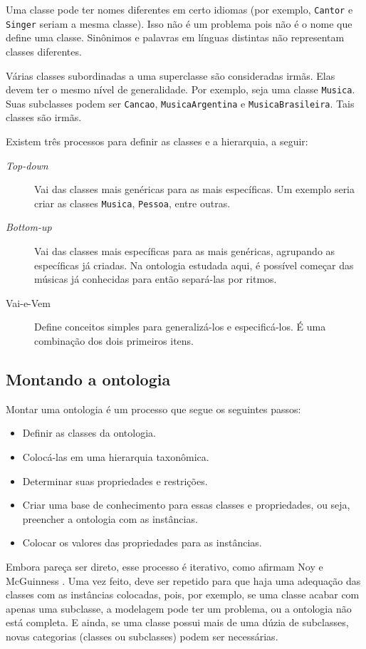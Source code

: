 Uma classe pode ter nomes diferentes em certo idiomas (por exemplo, \texttt{Cantor} e \texttt{Singer} seriam a mesma classe). Isso não é um problema pois não é o nome que define uma classe. Sinônimos e palavras em línguas distintas não representam classes diferentes.

Várias classes subordinadas a uma superclasse são consideradas irmãs. Elas devem ter o mesmo nível de generalidade. Por exemplo, seja uma classe \texttt{Musica}. Suas subclasses podem ser \texttt{Cancao}, \texttt{MusicaArgentina} e \texttt{MusicaBrasileira}. Tais classes são irmãs.

Existem três processos para definir as classes e a hierarquia, a seguir:

\begin{description}
	\item[\textit{Top-down}] Vai das classes mais genéricas para as mais específicas. Um exemplo seria criar as classes \texttt{Musica}, \texttt{Pessoa}, entre outras.
	\item[\textit{Bottom-up}] Vai das classes mais específicas para as mais genéricas, agrupando as específicas já criadas. Na ontologia estudada aqui, é possível começar das músicas já conhecidas para então separá-las por ritmos.
	\item[Vai-e-Vem] Define conceitos simples para generalizá-los e especificá-los. É uma com\-bi\-na\-ção dos dois primeiros itens.
\end{description}

\subsection{Montando a ontologia}

Montar uma ontologia é um processo que segue os seguintes passos:

\begin{itemize}
	\item Definir as classes da ontologia.
	\item Colocá-las em uma hierarquia taxonômica.
	\item Determinar suas propriedades e restrições.
	\item Criar uma base de conhecimento para essas classes e propriedades, ou seja, preencher a ontologia com as instâncias.
	\item Colocar os valores das propriedades para as instâncias.
\end{itemize}

Embora pareça ser direto, esse processo é iterativo, como afirmam Noy e McGuinness  \citep{ontoNoy}. Uma vez feito, deve ser repetido para que haja uma adequação das classes com as instâncias colocadas, pois, por exemplo, se uma classe acabar com apenas uma subclasse, a modelagem pode ter um problema, ou a ontologia não está completa. E ainda, se uma classe possui mais de uma dúzia de subclasses, novas categorias (classes ou subclasses) podem ser necessárias. 

